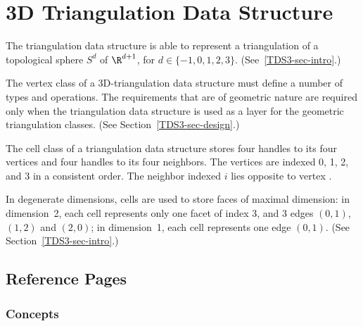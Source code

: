 \chapter{3D Triangulation Data Structure}

The triangulation data structure is able to represent a
triangulation of a topological sphere $S^d$ of $\R^{d+1}$, for 
$d \in \{-1,0,1,2,3\}$. (See~\ref{TDS3-sec-intro}.)

The vertex class of a 3D-triangulation data structure must define
a number of types and operations. 
The requirements that are of geometric nature are required only when
the triangulation data structure is used as a layer for the geometric
triangulation classes. (See Section~\ref{TDS3-sec-design}.)

The cell class of a triangulation data structure stores
four handles to its four vertices and four handles to its four
neighbors. The vertices are indexed 0, 1, 2, and 3 in a consistent order.
The neighbor indexed $i$ lies opposite to vertex .

In degenerate dimensions, cells are used to store faces of maximal
dimension: in dimension~2, each cell represents only one
facet of index 3, and 3 edges $(0,1)$, $(1,2)$ and $(2,0)$; in
dimension~1, each cell represents one edge $(0,1)$. (See 
Section~\ref{TDS3-sec-intro}.) 


\section{Reference Pages}

\subsection*{Concepts}

